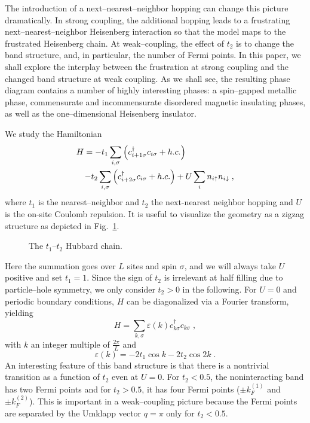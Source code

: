The introduction of a next--nearest--neighbor hopping can
change this picture dramatically.
In strong coupling, the additional hopping leads to a
frustrating next--nearest--neighbor Heisenberg interaction so that
the model maps to the frustrated Heisenberg chain.
At weak--coupling, the effect of $t_2$ is to change the band
structure, and, in particular, the number of Fermi points.
In this paper, we shall explore the interplay between the frustration at
strong coupling and the changed band structure at weak coupling.
As we shall see, the resulting phase diagram contains a number of highly
interesting phases: a spin--gapped metallic phase, 
commensurate and
incommensurate disordered magnetic insulating phases, as well as the
one--dimensional Heisenberg insulator.

We study the Hamiltonian
%
\begin{eqnarray}
  \lefteqn{ H = -t_1 \sum_{i,\sigma} \left( c^{\dagger}_{i+1\sigma}
                                            c_{i\sigma} + h.c.  
 \right) } \nonumber \\
&&      -t_2\sum_{i,\sigma}\left( c^{\dagger}_{i+2\sigma} c_{i\sigma} 
                                  + h.c. \right)
    + U \sum_i n_{i\uparrow}n_{i\downarrow} \; ,
\label{eqhamt1t2}
\end{eqnarray}
%
where $t_1$ is the nearest--neighbor and $t_2$ the next-nearest 
neighbor hopping and $U$ is the on-site Coulomb repulsion.
It is useful to visualize the geometry as a zigzag structure as
depicted in Fig.\ \ref{model}.
%
\begin{figure}[htb]
 \begin{center}
 \end{center}
 \caption{The $t_1$--$t_2$ Hubbard chain.}
 \label{model}
\end{figure}
%
\noindent
Here the summation goes over $L$ sites and spin $\sigma$, 
and we will always take $U$ positive and set $t_1=1$.
Since the sign of $t_2$ is irrelevant at half filling due to particle--hole
symmetry, we only consider $t_2>0$ in the following.
For $U=0$ and periodic boundary conditions, $H$ can be diagonalized
via a Fourier transform, yielding
\begin{equation}
  H = \sum_{k,\sigma} \varepsilon (k) c_{k\sigma}^{\dagger}c_{k\sigma} \; ,
\end{equation}
with $k$ an integer multiple of $\frac{2\pi}{L}$ and 
\begin{equation}
  \varepsilon (k) = -2t_1\cos k -2t_2\cos 2k \;.
\end{equation}
An interesting feature of this band structure is that there is a
nontrivial transition as a function of $t_2$ even at $U=0$.
For $t_2 < 0.5$, the noninteracting band has two Fermi points and
for $t_2 > 0.5 $, it has four Fermi points ($\pm k_F^{(1)}$ 
and $\pm k_F^{(2)}$).
This is important in a weak--coupling picture because the Fermi
points are separated by the Umklapp vector $q=\pi$ only for 
$t_2 < 0.5$.

